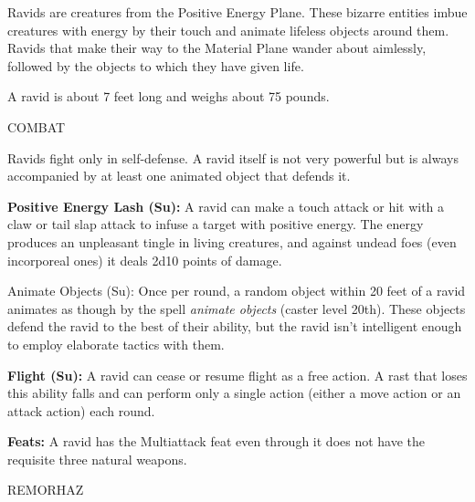 \documentclass{article}
\begin{document}
Ravids are creatures from the Positive Energy Plane. These bizarre entities imbue 
creatures with energy by their touch and animate lifeless objects around them. 
Ravids that make their way to the Material Plane wander about aimlessly, followed 
by the objects to which they have given life.

A ravid is about 7 feet long and weighs about 75 pounds.

COMBAT

Ravids fight only in self-defense. A ravid itself is not very powerful but is always 
accompanied by at least one animated object that defends it.

\textbf{Positive Energy Lash (Su): }A ravid can make a touch attack or hit with 
a claw or tail slap attack to infuse a target with positive energy. The energy 
produces an unpleasant tingle in living creatures, and against undead foes (even 
incorporeal ones) it deals 2d10 points of damage.

Animate Objects (Su): Once per round, a random object within 20 feet of a ravid 
animates as though by the spell \textit{animate objects }(caster level 20th). These 
objects defend the ravid to the best of their ability, but the ravid isn't intelligent 
enough to employ elaborate tactics with them.

\textbf{Flight (Su): }A ravid can cease or resume flight as a free action. A rast 
that loses this ability falls and can perform only a single action (either a move 
action or an attack action) each round.

\textbf{Feats:} A ravid has the Multiattack feat even through it does not have 
the requisite three natural weapons.

\vspace{12pt}
{\LARGE{}REMORHAZ}
\end{document}
